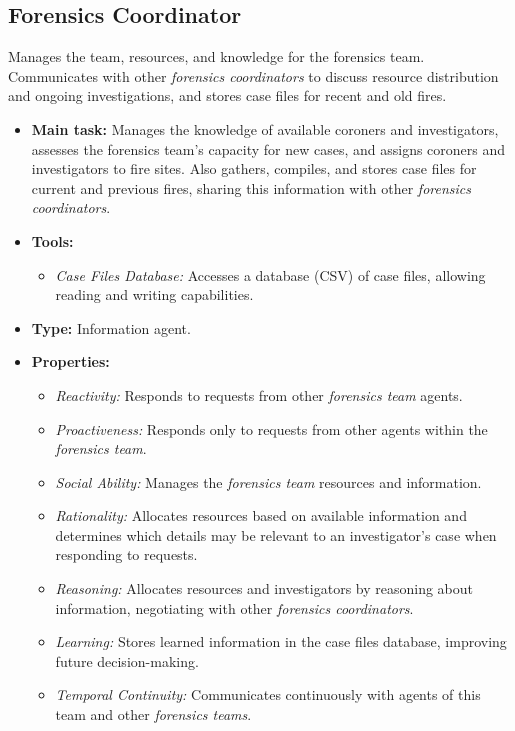 \documentclass{article}
\begin{document}
\subsection*{Forensics Coordinator}
Manages the team, resources, and knowledge for the forensics team. Communicates with other \textit{forensics coordinators} to discuss resource distribution and ongoing investigations, and stores case files for recent and old fires.
\begin{itemize}
    \item \textbf{Main task:} Manages the knowledge of available coroners and investigators, assesses the forensics team's capacity for new cases, and assigns coroners and investigators to fire sites. Also gathers, compiles, and stores case files for current and previous fires, sharing this information with other \textit{forensics coordinators}.
    \item \textbf{Tools:}
    \begin{itemize}
        \item \textit{Case Files Database:} Accesses a database (CSV) of case files, allowing reading and writing capabilities.
    \end{itemize}
    \item \textbf{Type:} Information agent.
    \item \textbf{Properties:}
    \begin{itemize}
        \item \textit{Reactivity:} Responds to requests from other \textit{forensics team} agents.
        \item \textit{Proactiveness:} Responds only to requests from other agents within the \textit{forensics team}.
        \item \textit{Social Ability:} Manages the \textit{forensics team} resources and information.
        \item \textit{Rationality:} Allocates resources based on available information and determines which details may be relevant to an investigator's case when responding to requests.
        \item \textit{Reasoning:} Allocates resources and investigators by reasoning about information, negotiating with other \textit{forensics coordinators}.
        \item \textit{Learning:} Stores learned information in the case files database, improving future decision-making.
        \item \textit{Temporal Continuity:} Communicates continuously with agents of this team and other \textit{forensics teams}.
    \end{itemize}
\end{itemize}
\end{document}
